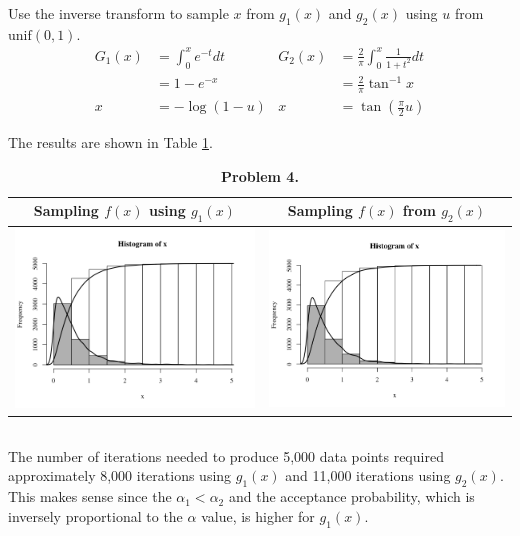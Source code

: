 \documentclass[11pt]{article}
\begin{document}
Use the inverse transform to sample $x$ from $g_1(x)$ and $g_2(x)$ using $u$ from $\textrm{unif}(0,1)$.
\begin{align*}
  G_1(x)&=\int_0^xe^{-t}dt&G_2(x)&=\frac{2}{\pi}\int_0^x\frac{1}{1+t^2}dt\\
        &=1-e^{-x}& &=\frac{2}{\pi}\tan^{-1}x\\
  x&=-\log(1-u)&x&=\tan\left(\frac{\pi}{2}u\right)
\end{align*}

The results are shown in Table \ref{double}.

\begin{table}[h!]
  \begin{center}
    \renewcommand{\arraystretch}{1.5}
    \begin{tabular}{|c|c|}
      \hline
      Sampling $f(x)$ using $g_1(x)$&Sampling $f(x)$ from $g_2(x)$\\\hline
      \includegraphics[width=0.42\linewidth,height=0.23\textheight]{density4a1}&
      \includegraphics[width=0.42\linewidth,height=0.23\textheight]{density4a2}\\\hline
    \end{tabular}
  \end{center}
  \caption{\textbf{Problem 4.}}
  \label{double}
\end{table}

\subsection{}

The number of iterations needed to produce 5,000 data points required approximately 8,000 iterations using $g_1(x)$ and 11,000 iterations using $g_2(x)$. This makes sense since the $\alpha_1<\alpha_2$ and the acceptance probability, which is inversely proportional to the $\alpha$ value, is higher for $g_1(x)$.
\end{document}
